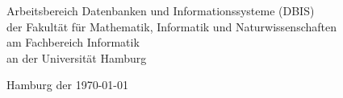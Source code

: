 \begin{titlepage}
\begin{center}
		Arbeitsbereich Datenbanken und Informationssysteme (DBIS)\\
		der Fakultät für Mathematik, Informatik und Naturwissenschaften\\
		am Fachbereich Informatik\\
		an der Universität Hamburg
		
		
		\vspace{1cm}
		
		{
			Hamburg der \today
		}
	\end{center}
\end{titlepage}